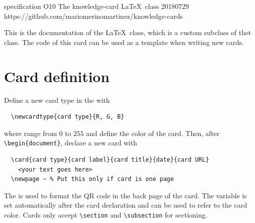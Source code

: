 \documentclass{knowledge-cards}
\begin{document}
  
\card%
{specification}%
{O10}%
{The knowledge-card \LaTeX\ class}%
{20180729}%
{https://github.com/mariomerinomartinez/knowledge-cards}

This is the documentation of the
 \LaTeX\ class, 
which is a custom subclass of thet  class. The code of this card can be used as a template when writing new cards.

\section{Card definition}
 
Define a new card type in the  
with
%
{ \color{\cardtype}%
\begin{verbatim}
  \newcardtype{card type}{R, G, B}
\end{verbatim}
}%
%
\noindent where  range from $0$ to $255$ and 
define the color of the card.
Then, after {\color{\cardtype} \verb|\begin{document}|}, 
declare a new card with
%
{\color{\cardtype}%
\begin{verbatim}
  \card{card type}{card label}{card title}{date}{card URL}
    <your text goes here> 
  \newpage ~ % Put this only if card is one page
\end{verbatim}
}%
%
\noindent 
The  is used to format the QR code in the back page
of the card.
The variable  is set automatically after the card declaration and can be used
to refer to the card color. 
Cards only accept {\color{\cardtype}\verb|\section|}
and {\color{\cardtype}\verb|\subsection|} for sectioning.
\end{document}
